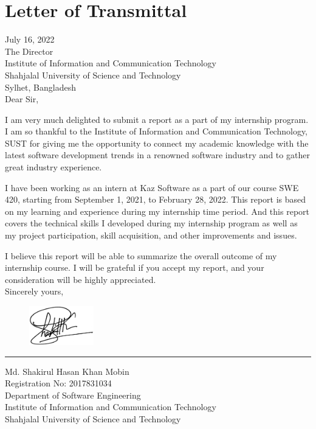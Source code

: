 \chapter*{Letter of Transmittal}

July 16, 2022\\
The Director\\
Institute of Information and Communication Technology\\
Shahjalal University of Science and Technology\\
Sylhet, Bangladesh\\

Dear Sir,

I am very much delighted to submit a report as a part of my internship program.
I am so thankful to the Institute of Information and Communication Technology, SUST for giving me the opportunity to connect my academic knowledge with the latest software development trends in a renowned software industry and to gather great industry experience.

I have been working as an intern at Kaz Software as a part of our course SWE 420, starting from September 1, 2021, to February 28, 2022.
This report is based on my learning and experience during my internship time period. And this report covers the technical skills I developed during my internship program as well as my project participation, skill acquisition, and other improvements and issues.

I believe this report will be able to summarize the overall outcome of my internship course.
I will be grateful if you accept my report, and your consideration will be highly appreciated.\\

Sincerely yours,
\begin{figure}[h]
    \includegraphics[width= 0.25\textwidth]{images/LetterOfTransmittal/mySignCropped.jpg}  
    \label{fig:mySign}
\end{figure}
\hrule height 0.4pt width 120pt
\vspace*{15pt}
Md. Shakirul Hasan Khan Mobin\\
Registration No: 2017831034\\
Department of Software Engineering\\
Institute of Information and Communication Technology\\
Shahjalal University of Science and Technology